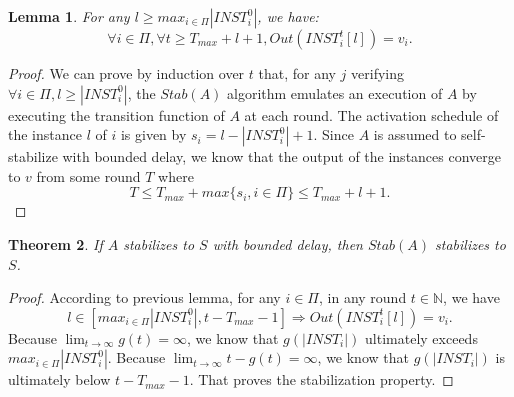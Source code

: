 \documentclass[11pt,letterpaper]{article}
\newtheorem{thm}{Theorem}
\newtheorem{lem}[thm]{Lemma}
\begin{document}
\begin{lem}
	For any $l \geq max_{i \in \Pi} |INST_i^0|$, we have:
	$$\forall i \in \Pi, \forall t \geq T_{max}+l+1, Out(INST_i^t[l]) = v_i.$$
\end{lem}
\begin{proof}
	We can prove by induction over $t$ that, for any $j$ verifying $\forall i \in \Pi, l \geq |INST_i^0|$,
	the $Stab(A)$ algorithm emulates an execution of $A$ by executing the transition function of $A$ at each round.
	The activation schedule of the instance $l$ of $i$ is given by $s_i = l-|INST_i^0|+1$.
	Since $A$ is assumed to self-stabilize with bounded delay, we know that the output of the instances converge to $v$ from some round $T$ where
	$$T \leq T_{max} + max\{s_i, i \in \Pi\} \leq T_{max} + l + 1.$$
\end{proof}

\begin{thm}
	If $A$ stabilizes to $S$ with bounded delay, then $Stab(A)$ stabilizes to $S$.
\end{thm}
\begin{proof}
	According to previous lemma, for any $i \in \Pi$, in any round $t \in \mathds{N}$, we have
	$$l \in [max_{i \in \Pi} |INST_i^0|, t-T_{max}-1] \Rightarrow Out(INST_i^t[l]) = v_i.$$
	Because $\lim_{t \rightarrow \infty} g(t) = \infty$, we know that $g(|INST_i|)$ ultimately exceeds $max_{i \in \Pi} |INST_i^0|$.
	Because $\lim_{t \rightarrow \infty} t-g(t) = \infty$, we know that $g(|INST_i|)$ is ultimately below $t-T_{max}-1$.
	That proves the stabilization property.
\end{proof}
\end{document}
